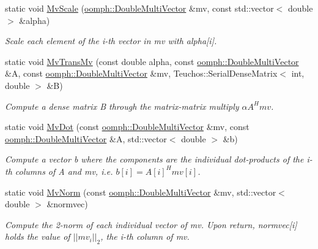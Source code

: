 \begin{DoxyCompactItemize}
static void \hyperlink{classAnasazi_1_1MultiVecTraits_3_01double_00_01oomph_1_1DoubleMultiVector_01_4_a75e3a2b5d0d65d3d5622205cd9b2ec37}{Mv\+Scale} (\hyperlink{classoomph_1_1DoubleMultiVector}{oomph\+::\+Double\+Multi\+Vector} \&mv, const std\+::vector$<$ double $>$ \&alpha)
\begin{DoxyCompactList}\small\item\em Scale each element of the {\ttfamily i-\/th} vector in {\ttfamily mv} with {\ttfamily alpha}\mbox{[}i\mbox{]}. \end{DoxyCompactList}\item 
static void \hyperlink{classAnasazi_1_1MultiVecTraits_3_01double_00_01oomph_1_1DoubleMultiVector_01_4_a338f59059891bc045555e3283949c6fa}{Mv\+Trans\+Mv} (const double alpha, const \hyperlink{classoomph_1_1DoubleMultiVector}{oomph\+::\+Double\+Multi\+Vector} \&A, const \hyperlink{classoomph_1_1DoubleMultiVector}{oomph\+::\+Double\+Multi\+Vector} \&mv, Teuchos\+::\+Serial\+Dense\+Matrix$<$ int, double $>$ \&B)
\begin{DoxyCompactList}\small\item\em Compute a dense matrix {\ttfamily B} through the matrix-\/matrix multiply $ \alpha A^Hmv $. \end{DoxyCompactList}\item 
static void \hyperlink{classAnasazi_1_1MultiVecTraits_3_01double_00_01oomph_1_1DoubleMultiVector_01_4_acb2e5efa75fb3970e1ecf716f10b4ee5}{Mv\+Dot} (const \hyperlink{classoomph_1_1DoubleMultiVector}{oomph\+::\+Double\+Multi\+Vector} \&mv, const \hyperlink{classoomph_1_1DoubleMultiVector}{oomph\+::\+Double\+Multi\+Vector} \&A, std\+::vector$<$ double $>$ \&b)
\begin{DoxyCompactList}\small\item\em Compute a vector {\ttfamily b} where the components are the individual dot-\/products of the {\ttfamily i-\/th} columns of {\ttfamily A} and {\ttfamily mv}, i.\+e. $b[i] = A[i]^Hmv[i]$. \end{DoxyCompactList}\item 
static void \hyperlink{classAnasazi_1_1MultiVecTraits_3_01double_00_01oomph_1_1DoubleMultiVector_01_4_ac6fd03656134d6fccd7113a6876ba97e}{Mv\+Norm} (const \hyperlink{classoomph_1_1DoubleMultiVector}{oomph\+::\+Double\+Multi\+Vector} \&mv, std\+::vector$<$ double $>$ \&normvec)
\begin{DoxyCompactList}\small\item\em Compute the 2-\/norm of each individual vector of {\ttfamily mv}. Upon return, {\ttfamily normvec}\mbox{[}i\mbox{]} holds the value of $||mv_i||_2$, the {\ttfamily i-\/th} column of {\ttfamily mv}. \end{DoxyCompactList}\end{DoxyCompactItemize}
